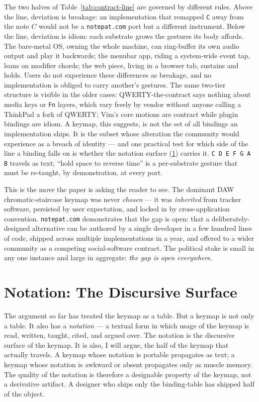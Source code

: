 \documentclass[10pt,letterpaper,twocolumn]{article}
\begin{document}
The two halves of Table~\ref{tab:contract-line} are governed by different rules. Above the line, deviation is breakage: an implementation that remapped \texttt{C} away from the note $C$ would not be a \texttt{notepat.com} port but a different instrument. Below the line, deviation is idiom: each substrate grows the gestures its body affords. The bare-metal OS, owning the whole machine, can ring-buffer its own audio output and play it backwards; the menubar app, riding a system-wide event tap, leans on modifier chords; the web piece, living in a browser tab, sustains and holds. Users do not experience these differences as breakage, and no implementation is obliged to carry another's gestures. The same two-tier structure is visible in the older cases: QWERTY-the-contract says nothing about media keys or \texttt{Fn} layers, which vary freely by vendor without anyone calling a ThinkPad a fork of QWERTY; Vim's core motions are contract while plugin bindings are idiom. A keymap, this suggests, is not the set of all bindings an implementation ships. It is the subset whose alteration the community would experience as a breach of identity --- and one practical test for which side of the line a binding falls on is whether the notation surface (\textsection\ref{sec:notation}) carries it. \texttt{C D E F G A B} travels as text; ``hold space to reverse time'' is a per-substrate gesture that must be re-taught, by demonstration, at every port.

This is the move the paper is asking the reader to see. The dominant DAW chromatic-staircase keymap was never \emph{chosen} --- it was \emph{inherited} from tracker software, persisted by user expectation, and locked in by cross-application convention. \texttt{notepat.com} demonstrates that the gap is open: that a deliberately-designed alternative can be authored by a single developer in a few hundred lines of code, shipped across multiple implementations in a year, and offered to a wider community as a competing social-software contract. The political stake is small in any one instance and large in aggregate: \emph{the gap is open everywhere}.

\section{Notation: The Discursive Surface}
\label{sec:notation}

The argument so far has treated the keymap as a table. But a keymap is not only a table. It also has a \emph{notation} --- a textual form in which usage of the keymap is read, written, taught, cited, and argued over. The notation is the discursive surface of the keymap. It is also, I will argue, the half of the keymap that actually travels. A keymap whose notation is portable propagates as text; a keymap whose notation is awkward or absent propagates only as muscle memory. The quality of the notation is therefore a designable property of the keymap, not a derivative artifact. A designer who ships only the binding-table has shipped half of the object.
\end{document}
